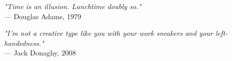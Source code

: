 \begin{flushright}
\emph{"Time is an illusion. Lunchtime doubly so."}\\
— Douglas Adams, 1979
\end{flushright}
\vspace{2em}
\begin{flushright}
\emph{"I'm not a creative type like you with your work sneakers and your left-handedness."}\\
— Jack Donaghy, 2008
\end{flushright}
